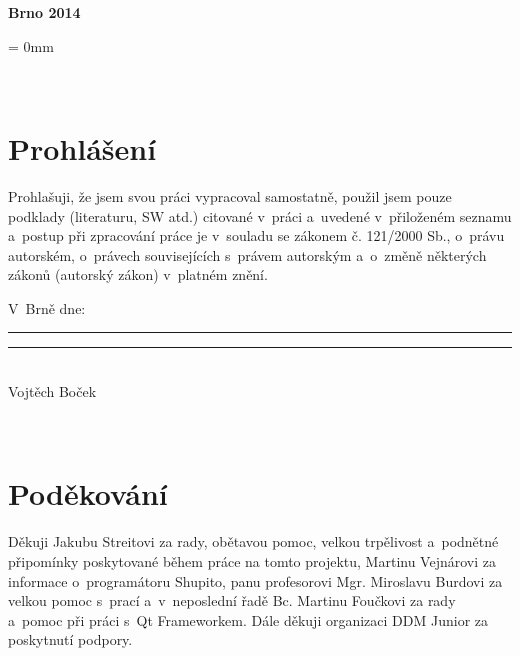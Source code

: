 \documentclass[12pt, a4paper, oneside]{article}
\newcommand{\B}{\textbf} %
\begin{document}
\vspace{20mm}

\begin{center}
\B{Brno 2014}

\end{center}
\normalsize
\newpage  %
\voffset = 0mm %

~ %

\vspace{10mm}

\section*{Prohlášení}

Prohlašuji, že jsem svou práci vypracoval samostatně, použil jsem pouze podklady (literaturu, SW atd.) citované v~práci a~uvedené v~přiloženém seznamu a~postup při zpracování práce je v~souladu se zákonem č. 121/2000 Sb., o~právu autorském, o~právech souvisejících s~právem autorským a~o~změně některých zákonů (autorský zákon) v~platném znění.

\vspace{10mm}

\noindent \parbox{\textwidth}{
\noindent V~Brně dne: \rule{4cm}{1pt}
\hfill\parbox{5cm}{
    \centering
    \vspace{9mm}
    \rule{5cm}{1pt}\\
        Vojtěch Boček
}
}
 

\newpage   %

~ %
\vspace{100mm}

\section*{Poděkování}
Děkuji Jakubu Streitovi za rady, obětavou pomoc, velkou trpělivost a~podnětné připomínky poskytované během práce na tomto projektu, Martinu Vejnárovi za informace o~programátoru Shupito, panu profesorovi Mgr. Miroslavu Burdovi za velkou pomoc s~prací a~v~neposlední řadě Bc. Martinu Foučkovi za rady a~pomoc při práci s~Qt Frameworkem. Dále děkuji organizaci DDM Junior za poskytnutí podpory.
 

\newpage   %
~ %
\vspace{-20mm}
\end{document}

